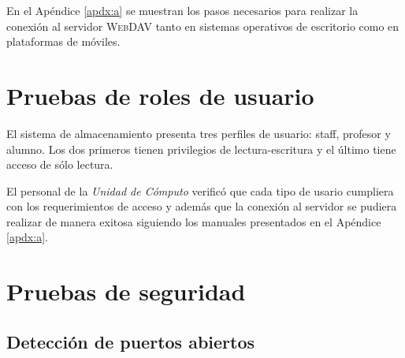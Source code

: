 En el \textup{Ap\'{e}ndice \ref{apdx:a}} se muestran los pasos necesarios para realizar la conexi\'{o}n al servidor \textsc{WebDAV} tanto en sistemas operativos de escritorio como en plataformas de m\'{o}viles.

    \section {Pruebas de roles de usuario}

El sistema de almacenamiento presenta tres perfiles de usuario: staff, profesor y alumno. Los dos primeros tienen privilegios de lectura-escritura y el \'{u}ltimo tiene acceso de s\'{o}lo lectura.

El personal de la \emph{Unidad de C\'{o}mputo} verific\'{o} que cada tipo de usario cumpliera con los requerimientos de acceso y adem\'{a}s que la conexi\'{o}n al servidor se pudiera realizar de manera exitosa siguiendo los manuales presentados en el \textup{Ap\'{e}ndice \ref{apdx:a}}.

{
 \linespread{1}
 \begin{table}[H]
 \caption{Perfiles de usuario y tipo de acceso}{}
 \label{tab:user-profiles}
 \noindent{} %
 \end{table}
}

    \section {Pruebas de seguridad}

      \subsection {Detecci\'{o}n de puertos abiertos}

